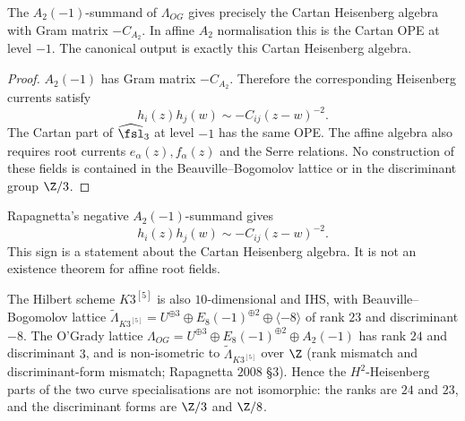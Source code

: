 \begin{theorem}
\label{thm:wakimoto-realisation-og10}
\ClaimStatusProvedHere
{}%
%
The \(A_2(-1)\)-summand of \(\Lambda_{OG}\) gives precisely the Cartan
Heisenberg algebra with Gram matrix \(-C_{A_2}\). In affine \(A_2\)
normalisation this is the Cartan OPE at level \(-1\). The canonical output
is exactly this Cartan Heisenberg algebra.
\end{theorem}

\begin{proof}
\(A_2(-1)\) has Gram matrix \(-C_{A_2}\). Therefore the corresponding
Heisenberg currents satisfy
\[
 h_i(z)h_j(w)\sim -C_{ij}(z-w)^{-2}.
\]
The Cartan part of \(\widehat{\fsl}_3\) at level \(-1\) has the same OPE.
The affine algebra also requires root currents \(e_\alpha(z),f_\alpha(z)\)
and the Serre relations. No construction of these fields is contained in
the Beauville--Bogomolov lattice or in the discriminant group \(\Z/3\).
\end{proof}

\begin{remark}
\label{rem:og10-level-sign-derivation}
%
Rapagnetta's negative \(A_2(-1)\)-summand gives
\[
h_i(z)h_j(w)\sim -C_{ij}(z-w)^{-2}.
\]
This sign is a statement about the Cartan Heisenberg algebra. It is not an
existence theorem for affine root fields.
\end{remark}

\begin{remark}
\label{rem:og-10-vs-k3-5}
%
The Hilbert scheme $K3^{[5]}$ is also $10$-dimensional and IHS,
with Beauville--Bogomolov lattice
$\widetilde\Lambda_{K3^{[5]}} = U^{\oplus 3} \oplus
E_8(-1)^{\oplus 2} \oplus \langle -8\rangle$ of rank $23$ and
discriminant $-8$. The O'Grady lattice $\Lambda_{OG} =
U^{\oplus 3} \oplus E_8(-1)^{\oplus 2} \oplus A_2(-1)$ has rank
$24$ and discriminant $3$, and is non-isometric to
$\widetilde\Lambda_{K3^{[5]}}$ over $\Z$ (rank mismatch and
discriminant-form mismatch; Rapagnetta $2008$ \S$3$). Hence the
\(H^2\)-Heisenberg parts of the two curve specialisations are not
isomorphic: the ranks are \(24\) and \(23\), and the discriminant forms are
\(\Z/3\) and \(\Z/8\).
\end{remark}


